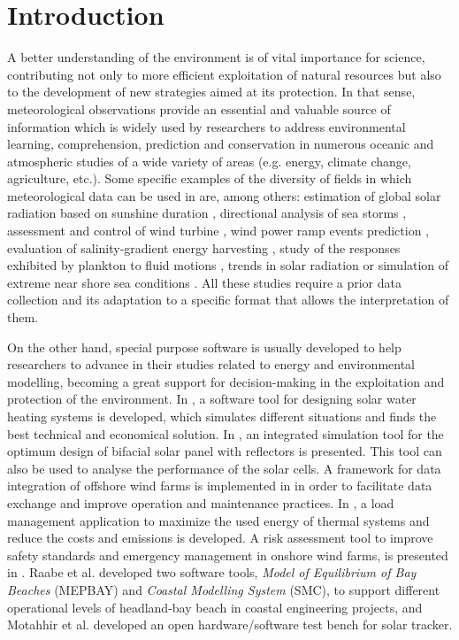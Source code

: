 \documentclass[review]{elsarticle}
\begin{document}
	\linenumbers

	\section{Introduction}
		
		A better understanding of the environment is of vital importance for science, contributing not only to more efficient exploitation of natural resources but also to the development of new strategies aimed at its protection. In that sense, meteorological observations provide an essential and valuable source of information which is widely used by researchers to address environmental learning, comprehension, prediction and conservation in numerous oceanic and atmospheric studies of a wide variety of areas (e.g. energy, climate change, agriculture, etc.). Some specific examples of the diversity of fields in which meteorological data can be used in are, among others: estimation of global solar radiation based on sunshine duration \cite{SHAHRUKHANIS2019179}, directional analysis of sea storms \cite{LAFACE201545}, assessment and control of wind turbine \cite{DAHHANI2018167}, wind power ramp events prediction \cite{DORADOMORENO2017428}, evaluation of salinity-gradient energy harvesting \cite{REYESMENDOZA2020100645}, study of the responses exhibited by plankton to fluid motions \cite{FUCHS2016109}, trends in solar radiation \cite{SILVA20101852} or simulation of extreme near shore sea conditions \cite{GOULDBY201415}. All these studies require a prior data collection and its adaptation to a specific format that allows the interpretation of them.
		
		On the other hand, special purpose software is usually developed to help researchers to advance in their studies related to energy and environmental modelling, becoming a great support for decision-making in the exploitation and protection of the environment. In \cite{CAMARGONOGUEIRA2016361}, a software tool for designing solar water heating systems is developed, which simulates different situations and finds the best technical and economical solution. In \cite{LO2015293}, an integrated simulation tool for the optimum design of bifacial solar panel with reflectors is presented. This tool can also be used to analyse the performance of the solar cells. A framework for data integration of offshore wind farms is implemented in \cite{NGUYEN2013150} in order to facilitate data exchange and improve operation and maintenance practices. In \cite{SHEHADEH2020100644}, a load management application to maximize the used energy of thermal systems and reduce the costs and emissions is developed. A risk assessment tool to improve safety standards and emergency management in onshore wind farms, is presented in \cite{ASTIASOGARCIA201648}. Raabe et al. \cite{RAABE2010213} developed two software tools, \textit{Model of Equilibrium of Bay Beaches} (MEPBAY) and \textit{Coastal Modelling System} (SMC), to support different operational levels of headland-bay beach in coastal engineering projects, and Motahhir et al. \cite{MOTAHHIR20199} developed an open hardware/software test bench for solar tracker.
		
\end{document}
